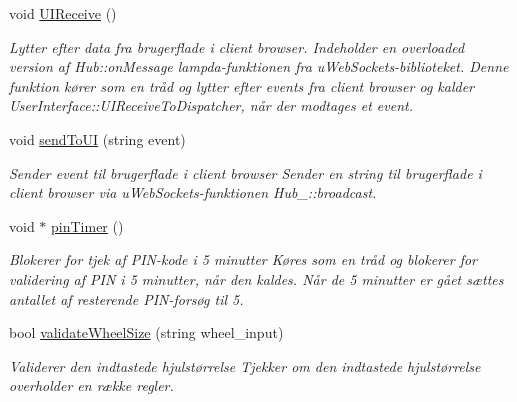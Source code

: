 \begin{DoxyCompactItemize}
\mbox{\label{classUserInterface_a80c3e5e03d4f7d57d339badb4cf1eae6}} 
void \hyperlink{classUserInterface_a80c3e5e03d4f7d57d339badb4cf1eae6}{U\+I\+Receive} ()
\begin{DoxyCompactList}\small\item\em Lytter efter data fra brugerflade i client browser. Indeholder en overloaded version af Hub\+::on\+Message lampda-\/funktionen fra u\+Web\+Sockets-\/biblioteket. Denne funktion kører som en tråd og lytter efter events fra client browser og kalder User\+Interface\+::\+U\+I\+Receive\+To\+Dispatcher, når der modtages et event. \end{DoxyCompactList}\item 
void \hyperlink{classUserInterface_a44b574eb614bb90bb370f027ce88b8ea}{send\+To\+UI} (string event)
\begin{DoxyCompactList}\small\item\em Sender event til brugerflade i client browser Sender en string til brugerflade i client browser via u\+Web\+Sockets-\/funktionen Hub\+\_\+\+::broadcast. \end{DoxyCompactList}\item 
\mbox{\label{classUserInterface_add59ee8e8c6cd74bd89dc1b529e5db95}} 
void $\ast$ \hyperlink{classUserInterface_add59ee8e8c6cd74bd89dc1b529e5db95}{pin\+Timer} ()
\begin{DoxyCompactList}\small\item\em Blokerer for tjek af P\+I\+N-\/kode i 5 minutter Køres som en tråd og blokerer for validering af P\+IN i 5 minutter, når den kaldes. Når de 5 minutter er gået sættes antallet af resterende P\+I\+N-\/forsøg til 5. \end{DoxyCompactList}\item 
bool \hyperlink{classUserInterface_a569c725b82d4ba420574f072e0bfc866}{validate\+Wheel\+Size} (string wheel\+\_\+input)
\begin{DoxyCompactList}\small\item\em Validerer den indtastede hjulstørrelse Tjekker om den indtastede hjulstørrelse overholder en række regler. \end{DoxyCompactList}\end{DoxyCompactItemize}

